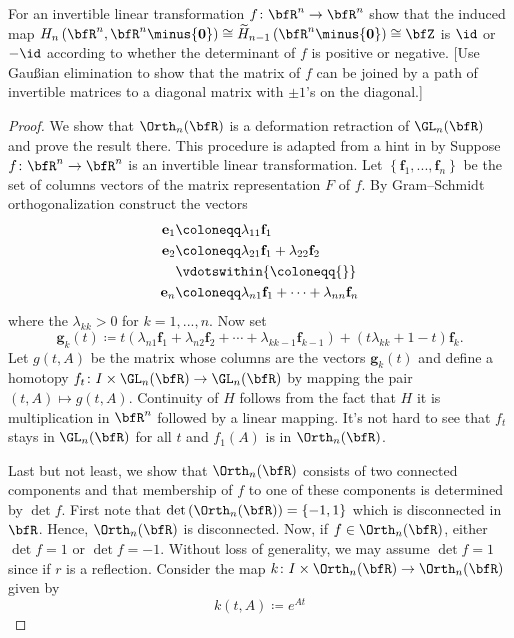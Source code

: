 \begin{problem}[Hatcher {\S}2.2, Ex.\@ 7]
For an invertible linear transformation $f\colon\bfR^n\to\bfR^n$ show that
the induced map
$H_n\left(\bfR^n,\bfR^n\minus\{\mathbf{0}\}\right)\cong\widetilde
H_{n-1}\left(\bfR^n\minus\{\mathbf{0}\}\right)\cong\bfZ$ is $\id$ or $-\id$
according to whether the determinant of $f$ is positive or negative. [Use
Gaußian elimination to show that the matrix of $f$ can be joined by a path
of invertible matrices to a diagonal matrix with $\pm 1$'s on the
diagonal.]
\end{problem}
\begin{proof}
We show that $\Orth_n(\bfR)$ is a deformation retraction of $\GL_n(\bfR)$
and prove the result there. This procedure is adapted from a hint in
\emph{} by  Suppose $f\colon\bfR^n\to\bfR^n$ is
an invertible linear transformation. Let
$\left\{\mathbf{f}_1,...,\mathbf{f}_n\right\}$ be the set of columns
vectors of the matrix representation $F$ of $f$. By Gram--Schmidt
orthogonalization construct the vectors
\begin{equation}
\label{eq:gram-schmidt-orth}
\begin{aligned}
\mathbf{e}_1&\coloneqq\lambda_{11}\mathbf{f}_1\\
\mathbf{e}_2&\coloneqq\lambda_{21}\mathbf{f}_1+\lambda_{22}\mathbf{f}_2\\
&\vdotswithin{{}\coloneqq{}}\\
\mathbf{e}_n&\coloneqq\lambda_{n1}\mathbf{f}_1+\cdots+\lambda_{nn}\mathbf{f}_n
\end{aligned}
\end{equation}
where the $\lambda_{kk}>0$ for $k=1,...,n$. Now set
\begin{equation}
\label{eq:vectors-as-function-of-t}
\mathbf{g}_k(t)\coloneqq
t\left(\lambda_{n1}\mathbf{f}_1+\lambda_{n2}\mathbf{f}_2+\cdots+\lambda_{kk-1}\mathbf{f}_{k-1}\right)+(t\lambda_{kk}+1-t)\mathbf{f}_k.
\end{equation}
Let $g(t,A)$ be the matrix whose columns are the vectors $\mathbf{g}_k(t)$
and define a homotopy $f_t\colon I\times\GL_n(\bfR)\to\GL_n(\bfR)$ by mapping
the pair $(t,A)\mapsto g(t,A)$. Continuity of $H$ follows from the fact
that $H$ it is multiplication in $\bfR^n$ followed by a linear
mapping. It's not hard to see that $f_t$ stays in $\GL_n(\bfR)$ for all $t$
and $f_1(A)$ is in $\Orth_n(\bfR)$.

Last but not least, we show that $\Orth_n(\bfR)$ consists of two connected
components and that membership of $f$ to one of these components is
determined by $\det f$. First note that
$\det\left(\Orth_n(\bfR)\right)=\{-1,1\}$ which is disconnected in
$\bfR$. Hence, $\Orth_n(\bfR)$ is disconnected. Now, if
$f\in\Orth_n(\bfR)$, either $\det f=1$ or $\det f=-1$. Without loss of
generality, we may assume $\det f=1$ since if $r$ is a reflection. Consider
the map $k \colon I\times \Orth_n(\bfR)\to\Orth_n(\bfR)$ given by
\begin{equation}
  \label{eq:homotopy-det-1}
k(t,A)\coloneqq e^{At}
\end{equation}
\end{proof}
\newpage

